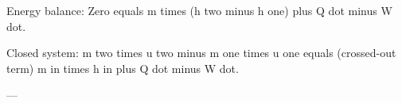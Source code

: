 Energy balance:  
Zero equals m times (h two minus h one) plus Q dot minus W dot.  

Closed system:  
m two times u two minus m one times u one equals (crossed-out term) m in times h in plus Q dot minus W dot.  

---